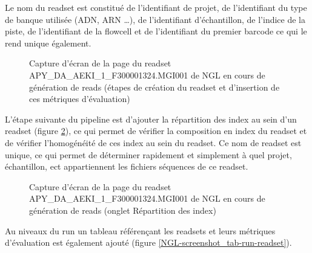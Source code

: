 Le nom du readset est constitué de l'identifiant de projet, de l'identifiant du type de banque utilisée (ADN, ARN \dots), de l'identifiant d'échantillon, de l'indice de la piste, de l'identifiant de la flowcell et de l'identifiant du premier barcode ce qui le rend unique également.

\begin{figure}[H]
    \centering
    \caption{\footnotesize{Capture d'écran de la page du readset APY\_DA\_AEKI\_1\_F300001324.MGI001 de NGL en cours de génération de reads (étapes de création du readset et d'insertion de ces métriques d'évaluation)}}
    \label{NGL-screenshot_readset}
\end{figure}

L'étape suivante du pipeline est d'ajouter la répartition des index au sein d'un readset (figure \ref{NGL-screenshot_readset-index}), ce qui permet de vérifier la composition en index du readset et de vérifier l'homogénéité de ces index au sein du readset.
Ce nom de readset est unique, ce qui permet de déterminer rapidement et simplement à quel projet, échantillon, ect appartiennent les fichiers séquences de ce readset.

\begin{figure}[H]
    \centering
    \caption{\footnotesize{Capture d'écran de la page du readset APY\_DA\_AEKI\_1\_F300001324.MGI001 de NGL en cours de génération de reads (onglet \og Répartition des index\fg{})}}
    \label{NGL-screenshot_readset-index}
\end{figure}

Au niveaux du run un tableau référençant les readsets et leurs métriques d'évaluation est également ajouté (figure \ref{NGL-screenshot_tab-run-readset}).

